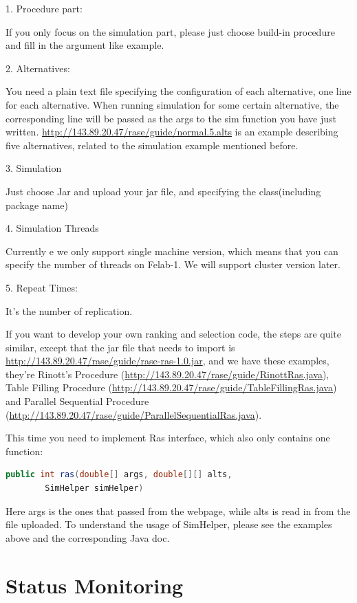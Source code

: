 \documentclass[12pt,a4paper]{report}
\begin{document}
1.	Procedure part:

If you only focus on the simulation part, please just choose build-in procedure and fill in the argument like example.

2.	Alternatives:

You need a plain text file specifying the configuration of each alternative, one line for each alternative. When running simulation for some certain alternative, the corresponding line will be passed as the args to the sim function you have just written. \url{http://143.89.20.47/rase/guide/normal.5.alts} is an example describing five alternatives, related to the simulation example mentioned before.

3.	Simulation

Just choose Jar and upload your jar file, and specifying the class(including package name)

4.	Simulation Threads

Currently e we only support single machine version, which means that you can specify the number of threads on Felab-1. We will support cluster version later.

5.	Repeat Times:

It’s the number of replication.

If you want to develop your own ranking and selection code, the steps are quite similar, except that the jar file that needs to import is \url{http://143.89.20.47/rase/guide/rase-ras-1.0.jar}, and we have these examples, they’re Rinott’s Procedure (\url{http://143.89.20.47/rase/guide/RinottRas.java}), Table Filling Procedure (\url{http://143.89.20.47/rase/guide/TableFillingRas.java}) and Parallel Sequential Procedure (\url{http://143.89.20.47/rase/guide/ParallelSequentialRas.java}).

This time you need to implement Ras interface, which also only contains one function:

\begin{lstlisting}[language=Java]
public int ras(double[] args, double[][] alts,
        SimHelper simHelper)
\end{lstlisting}

Here args is the ones that passed from the webpage, while alts is read in from the file uploaded. To understand the usage of SimHelper, please see the examples above and the corresponding Java doc.

\chapter{Status Monitoring}
\end{document}
